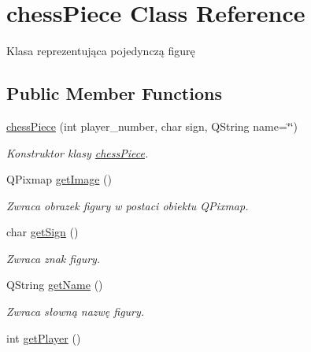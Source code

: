 \hypertarget{classchess_piece}{}\section{chess\+Piece Class Reference}
\label{classchess_piece}


Klasa reprezentująca pojedynczą figurę  


\subsection*{Public Member Functions}
\begin{DoxyCompactItemize}
\item 
\hyperlink{classchess_piece_a2045dacd528cc380a1776d851b4583c8}{chess\+Piece} (int player\+\_\+number, char sign, Q\+String name=\char`\"{}\char`\"{})
\begin{DoxyCompactList}\small\item\em Konstruktor klasy \hyperlink{classchess_piece}{chess\+Piece}. \end{DoxyCompactList}\item 
Q\+Pixmap \hyperlink{classchess_piece_ae86984a51801d6f7bcd227e725084df4}{get\+Image} ()
\begin{DoxyCompactList}\small\item\em Zwraca obrazek figury w postaci obiektu Q\+Pixmap. \end{DoxyCompactList}\item 
\mbox{\label{classchess_piece_acbc5b0aaf67995a864197e73842845dc}} 
char \hyperlink{classchess_piece_acbc5b0aaf67995a864197e73842845dc}{get\+Sign} ()
\begin{DoxyCompactList}\small\item\em Zwraca znak figury. \end{DoxyCompactList}\item 
\mbox{\label{classchess_piece_a112a342de4a58271b658615800f50ea2}} 
Q\+String \hyperlink{classchess_piece_a112a342de4a58271b658615800f50ea2}{get\+Name} ()
\begin{DoxyCompactList}\small\item\em Zwraca słowną nazwę figury. \end{DoxyCompactList}\item 
\mbox{\label{classchess_piece_a3a46c87ea362e4fa3204c3f257d7f439}} 
int \hyperlink{classchess_piece_a3a46c87ea362e4fa3204c3f257d7f439}{get\+Player} ()

\end{DoxyCompactItemize}
